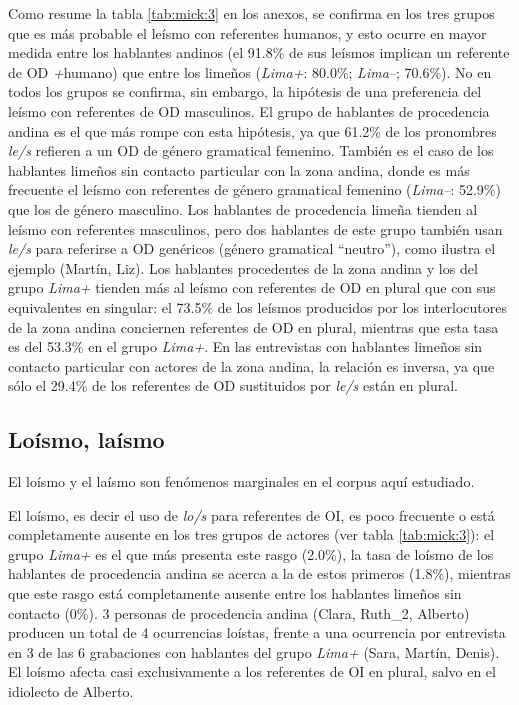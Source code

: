 \documentclass[output=paper]{../langscibook}
\begin{document}
Como resume la tabla \ref{tab:mick:3} en los anexos, se confirma en los tres grupos que es más probable el leísmo con referentes humanos, y esto ocurre en mayor medida entre los hablantes andinos (el 91.8\% de sus leísmos implican un referente de OD \textit{+}humano) que entre los limeños (\textit{Lima+}: 80.0\%; \textit{Lima–}; 70.6\%). No en todos los grupos se confirma, sin embargo, la hipótesis de una preferencia del leísmo con referentes de OD masculinos. El grupo de hablantes de procedencia andina es el que más rompe con esta hipótesis, ya que 61.2\% de los pronombres \textit{le/s} refieren a un OD de género gramatical femenino. También es el caso de los hablantes limeños sin contacto particular con la zona andina, donde es más frecuente el leísmo con referentes de género gramatical femenino (\textit{Lima–}: 52.9\%) que los de género masculino. Los hablantes de procedencia limeña tienden al leísmo con referentes masculinos, pero dos hablantes de este grupo también usan \textit{le/s} para referirse a OD genéricos (género gramatical “neutro”), como ilustra el ejemplo  (Martín, Liz). Los hablantes procedentes de la zona andina y los del grupo \textit{Lima+} tienden más al leísmo con referentes de OD en plural que con sus equivalentes en singular: el 73.5\% de los leísmos producidos por los interlocutores de la zona andina conciernen referentes de OD en plural, mientras que esta tasa es del 53.3\% en el grupo \textit{Lima+}. En las entrevistas con hablantes limeños sin contacto particular con actores de la zona andina, la relación es inversa, ya que sólo el 29.4\% de los referentes de OD sustituidos por \textit{le/s} están en plural.

\subsection{Loísmo, laísmo}
El loísmo y el laísmo son fenómenos marginales en el corpus aquí estudiado. 

El loísmo, es decir el uso de \textit{lo/s} para referentes de OI, es poco frecuente o está completamente ausente en los tres grupos de actores (ver tabla \ref{tab:mick:3}): el grupo \textit{Lima+} es el que más presenta este rasgo (2.0\%), la tasa de loísmo de los hablantes de procedencia andina se acerca a la de estos primeros (1.8\%), mientras que este rasgo está completamente ausente entre los hablantes limeños sin contacto (0\%). 3 personas de procedencia andina (Clara, Ruth\_2, Alberto) producen un total de 4 ocurrencias loístas, frente a una ocurrencia por entrevista en 3 de las 6 grabaciones con hablantes del grupo \textit{Lima+} (Sara, Martín, Denis). El loísmo afecta casi exclusivamente a los referentes de OI en plural, salvo en el idiolecto de Alberto.
\end{document}
